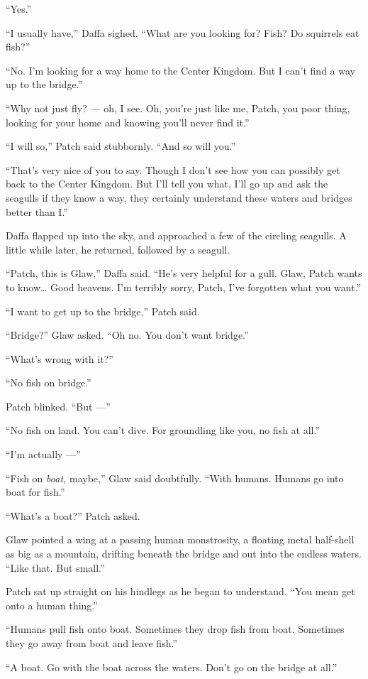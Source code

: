 \documentclass[ebook,oneside,openany,12pt]{memoir}
\begin{document}
“Yes.”

“I usually have,” Daffa sighed. “What are you looking for? Fish? Do
squirrels eat fish?”

“No. I’m looking for a way home to the Center Kingdom. But I can’t
find a way up to the bridge.”

“Why not just fly? — oh, I see. Oh, you’re just like me, Patch, you
poor thing, looking for your home and knowing you’ll never find it.”

“I will so,” Patch said stubbornly. “And so will you.”

“That’s very nice of you to say. Though I don’t see how you can
possibly get back to the Center Kingdom. But I’ll tell you what, I’ll
go up and ask the seagulls if they know a way, they certainly
understand these waters and bridges better than I.”

Daffa flapped up into the sky, and approached a few of the circling
seagulls. A little while later, he returned, followed by a seagull.

“Patch, this is Glaw,” Daffa said. “He’s very helpful for a
gull. Glaw, Patch wants to know… Good heavens. I’m terribly sorry,
Patch, I’ve forgotten what you want.”

“I want to get up to the bridge,” Patch said.

“Bridge?” Glaw asked. “Oh no. You don’t want bridge.”

“What’s wrong with it?”

“No fish on bridge.”

Patch blinked. “But —”

“No fish on land. You can’t dive. For groundling like you, no fish at
all.”

“I’m actually —”

“Fish on \emph{boat,} maybe,” Glaw said doubtfully. “With
humans. Humans go into boat for fish.”

“What’s a boat?” Patch asked.

Glaw pointed a wing at a passing human monstrosity, a floating metal
half-shell as big as a mountain, drifting beneath the bridge and out
into the endless waters. “Like that. But small.”

Patch sat up straight on his hindlegs as he began to understand. “You
mean get onto a human thing.”

“Humans pull fish onto boat. Sometimes they drop fish from
boat. Sometimes they go away from boat and leave fish.”

“A boat. Go with the boat across the waters. Don’t go on the bridge at
all.”
\end{document}
